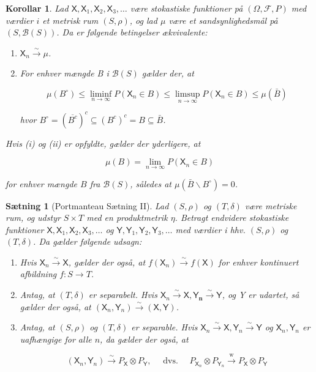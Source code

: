 \documentclass{article}
\newcommand{\1}{\mathbbm{1}}
\newcommand{\X}{\mathsf{X}}
\newcommand{\Y}{\mathsf{Y}}
\theoremstyle{boxed}
\newtheorem{corollary}[theorem]{Korollar}
\newtheorem{proposition}[theorem]{Sætning}
\begin{document}
\begin{theorem-box}
    \begin{corollary}
        Lad $\X, \X_1, \X_2, \X_3, \ldots$ være stokastiske funktioner på $(\Omega, \mathcal{F}, P)$ med værdier $i$ et metrisk rum $(S, \rho)$, og lad $\mu$ være et sandsynlighedsmål på $(S, \mathcal{B}(S))$. Da er følgende betingelser ækvivalente:
\begin{enumerate}
    \item[\textnormal{(i)}] $\X_n \xrightarrow{\sim} \mu$.
    \item[\textnormal{(ii)}] For enhver mængde B i $\mathcal{B}(S)$ gælder der, at

    $$
    \mu\left(B^{\circ}\right) \leq \liminf _{n \rightarrow \infty} P\left(\X_n \in B\right) \leq \limsup _{n \rightarrow \infty} P\left(\X_n \in B\right) \leq \mu(\bar{B})
    $$
    
    hvor $B^{\circ}=\left(\overline{B^c}\right)^c \subseteq\left(B^c\right)^c=B \subseteq \bar{B}$.
\end{enumerate} 
Hvis (i) og (ii) er opfyldte, gælder der yderligere, at

$$
\mu(B)=\lim _{n \rightarrow \infty} P\left(\X_n \in B\right)
$$

for enhver mængde $B$ fra $\mathcal{B}(S)$, således at $\mu\left(\bar{B} \backslash B^{\circ}\right)=0$.
    \end{corollary}
\end{theorem-box}
\begin{theorem-box}
    \begin{proposition}[Portmanteau Sætning II]
        Lad $(S, \rho)$ og $(T, \delta)$ være metriske rum, og udstyr $S \times T$ med en produktmetrik $\eta$.
Betragt endvidere stokastiske funktioner $\X, \X_1, \X_2, \X_3, \ldots$ og $\Y, \Y_1, \Y_2, \Y_3, \ldots$ med værdier i hhv. $(S, \rho)$ og $(T, \delta)$.
Da gælder følgende udsagn:
\begin{enumerate}
    \item[\textnormal{(i)}]Hvis $\X_n \xrightarrow{\sim} \X$, gælder der også, at $f\left(\X_n\right) \xrightarrow{\sim} f(\X)$ for enhver kontinuert afbildning $f: S \rightarrow T$.
    \item[\textnormal{(ii)}]Antag, at $(T, \delta)$ er separabelt. Hvis $\X_n \xrightarrow{\sim} \X, \Y_{\boldsymbol{n}} \xrightarrow{\sim} \Y$, og Y er udartet, så gælder der også, at $\left(\X_n, \Y_n\right) \xrightarrow{\sim}(\X, \Y)$.
    \item[\textnormal{(iii)}]Antag, at $(S, \rho)$ og $(T, \delta)$ er separable. Hvis $\X_n \xrightarrow{\sim} \X, \Y_n \xrightarrow{\sim} \Y$ og $\X_n, \Y_n$ er uafhængige for alle $n$, da gælder der også, at

    $$
    \left(\X_n, \Y_n\right) \xrightarrow{\sim} P_{\X} \otimes P_{\Y}, \quad \text { dvs. } \quad P_{\X_n} \otimes P_{\Y_n} \xrightarrow{\mathrm{w}} P_{\X} \otimes P_{\Y}
    $$
\end{enumerate}


    \end{proposition}
\end{theorem-box}
\end{document}
